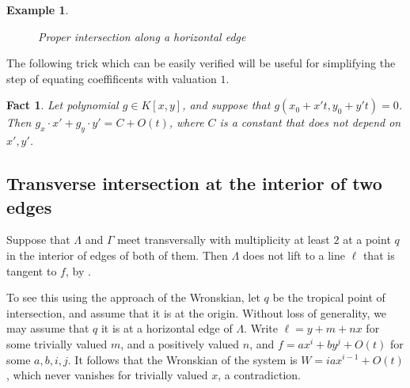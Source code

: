 \documentclass[oneside]{amsart}
\newtheorem{fact}[thm]{Fact}
\newtheorem{example}[thm]{Example}
\theoremstyle{definition}
\begin{document}
\begin{example}
\begin{figure}
\centering
{}   

\caption{Proper intersection along a horizontal edge}
\label{ProperHorizontal}
\end{figure}


\end{example}


The following trick which can be easily verified will be useful for simplifying the step of equating coeffificents with valuation $1$. 
\begin{fact}\label{fact:trick}
Let polynomial $g\in K[x,y]$, and suppose that $g(x_0 + x't,y_0+y't) = 0$. Then $g_x\cdot x' + g_y\cdot y' = C + O(t)$, where $C$ is a constant that does not depend on $x',y'$.  
\end{fact}

\subsection{Transverse intersection at the interior of two edges}
Suppose that $\Lambda$ and $\Gamma$ meet transversally with multiplicity at least $2$ at a point $q$ in the interior of edges of both of them. 
Then  $\Lambda$ does not lift to a line $\ell$ that is tangent to $f$, by \cite[Lemma 3.13]{BrugalleLopez}.  

To see this using the approach of the Wronskian, let $q$ be the tropical point of intersection, and assume that it is at the origin. Without loss of generality, we  may assume that $q$ it is at a horizontal edge of $\Lambda$. Write $\ell = y+m+nx$ for some trivially valued $m$, and a positively valued $n$, and $f = ax^i + by^j + O(t)$ for some $a,b,i,j$. It follows that the Wronskian of the system is $W = iax^{i-1} + O(t)$, which never vanishes for trivially valued $x$, a contradiction. 
\end{document}
